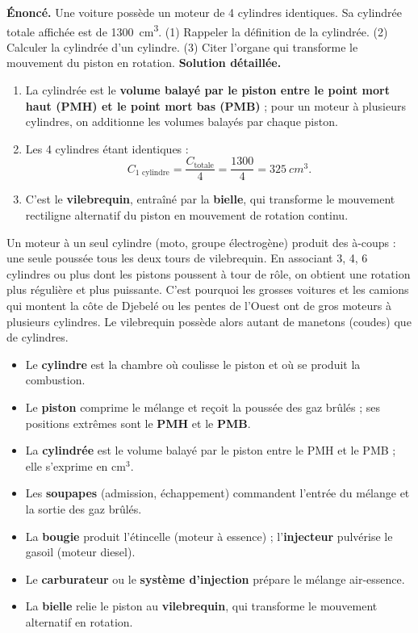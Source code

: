 \documentclass[11pt]{article}
\begin{document}
\begin{exoresolu}
\textbf{Énoncé.} Une voiture possède un moteur de 4 cylindres identiques. Sa cylindrée totale affichée est de \SI{1300}{cm^3}. (1) Rappeler la définition de la cylindrée. (2) Calculer la cylindrée d'un cylindre. (3) Citer l'organe qui transforme le mouvement du piston en rotation.
\tcblower
\textbf{Solution détaillée.}
\begin{enumerate}
\item La cylindrée est le \textbf{volume balayé par le piston entre le point mort haut (PMH) et le point mort bas (PMB)} ; pour un moteur à plusieurs cylindres, on additionne les volumes balayés par chaque piston.
\item Les 4 cylindres étant identiques :
\[ C_{\text{1 cylindre}} = \dfrac{C_{\text{totale}}}{4} = \dfrac{1300}{4} = \SI{325}{cm^3}. \]
\item C'est le \textbf{vilebrequin}, entraîné par la \textbf{bielle}, qui transforme le mouvement rectiligne alternatif du piston en mouvement de rotation continu.
\end{enumerate}
\end{exoresolu}

\begin{savaistu}
Un moteur à un seul cylindre (moto, groupe électrogène) produit des à-coups : une seule poussée tous les deux tours de vilebrequin. En associant 3, 4, 6 cylindres ou plus dont les pistons poussent à tour de rôle, on obtient une rotation plus régulière et plus puissante. C'est pourquoi les grosses voitures et les camions qui montent la côte de Djebelé ou les pentes de l'Ouest ont de gros moteurs à plusieurs cylindres. Le vilebrequin possède alors autant de manetons (coudes) que de cylindres.
\end{savaistu}

\begin{aretenir}
\begin{itemize}
\item Le \textbf{cylindre} est la chambre où coulisse le piston et où se produit la combustion.
\item Le \textbf{piston} comprime le mélange et reçoit la poussée des gaz brûlés ; ses positions extrêmes sont le \textbf{PMH} et le \textbf{PMB}.
\item La \textbf{cylindrée} est le volume balayé par le piston entre le PMH et le PMB ; elle s'exprime en cm$^3$.
\item Les \textbf{soupapes} (admission, échappement) commandent l'entrée du mélange et la sortie des gaz brûlés.
\item La \textbf{bougie} produit l'étincelle (moteur à essence) ; l'\textbf{injecteur} pulvérise le gasoil (moteur diesel).
\item Le \textbf{carburateur} ou le \textbf{système d'injection} prépare le mélange air-essence.
\item La \textbf{bielle} relie le piston au \textbf{vilebrequin}, qui transforme le mouvement alternatif en rotation.
\end{itemize}
\end{aretenir}
\end{document}
